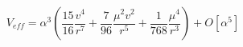 \begin{equation}
V_{eff} =\alpha^3 (\frac{15}{16}\frac{v^4}{r^7}
+\frac{7}{96}\frac{\mu^2v^2}{r^5}+\frac{1}{768} \frac{\mu^4}{r^3}) +
O[\alpha^5]
\end{equation}

